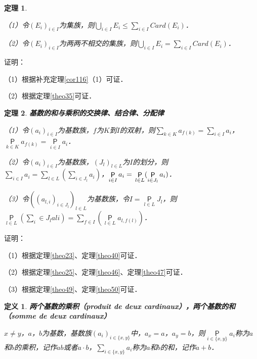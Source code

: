 \documentclass[12pt, a4paper, oneside]{book}
\newtheorem{theo}{定理}
\newtheorem{de}{定义}
\begin{document}
			\begin{theo}\label{theo94}
				\hfill\par
				（1）令$(E_i)_{i\in I}$为集族，则$\bigcup\limits_{i\in I}E_i\leq \sum\limits_{i\in I}Card(E_i)$．
				\par
				（2）令$(E_i)_{i\in I}$为两两不相交的集族，则$\bigcup\limits_{i\in I}E_i=\sum\limits_{i\in I}Card(E_i)$．
			\end{theo}
			证明：
			\par
			（1）根据补充定理\ref{cor116}（1）可证．
			\par
			（2）根据定理\ref{theo35}可证．

			\begin{theo}\label{theo95}
				\textbf{基数的和与乘积的交换律、结合律、分配律}
				\par
				（1）令$(a_i)_{i\in I}$为基数族，$f$为$K$到$I$的双射，则$\sum\limits_{k\in K}a_{f(k)}=\sum\limits_{i\in I}a_i$，$\mathop{\mathsf{P}}\limits_{k\in K}a_{f(k)}=\mathop{\mathsf{P}}\limits_{i\in I}a_i$．
				\par
				（2）令$(a_i)_{i\in I}$为基数族，$(J_l)_{l\in L}$为$I$的划分，则$\sum\limits_{i\in I}a_i=\sum\limits_{l\in L}(\sum\limits_{i\in J_l}a_i)$，$\mathop{\mathsf{P}}\limits_{i\in I}a_i=\\\mathop{\mathsf{P}}\limits_{l\in L}(\mathop{\mathsf{P}}\limits_{i\in J_l}a_i)$．
				\par
				（3）令$((a_{l,i})_{i\in J_l})_{l\in L}$为基数族，令$I=\mathop{\mathsf{P}}\limits_{l\in L}J_l$，则$\mathop{\mathsf{P}}\limits_{l\in L}(\sum\limits_i\in J_lali)=\sum\limits_{f\in I}(\mathop{\mathsf{P}}\limits_{l\in L}a_{l,f(l)})$．
			\end{theo}
			证明：
			\par
			（1）根据定理\ref{theo23}、定理\ref{theo40}可证．
			\par
			（2）根据定理\ref{theo25}、定理\ref{theo46}、定理\ref{theo47}可证．
			\par
			（3）根据定理\ref{theo49}、定理\ref{theo50}可证．
			
			\begin{de}
				\textbf{两个基数的乘积（produit de deux cardinaux），两个基数的和（somme de deux cardinaux）}
				\par
				$x\neq y$，$a$，$b$为基数，基数族$(a_i)_{i\in \{x, y\}}$中，$a_x=a$，$a_y=b$，则$\mathop{\mathsf{P}}\limits_{i\in \{x, y\}}a_i$称为$a$和$b$的乘积，记作$ab$或者$a\cdot b$，$\sum\limits_{i\in \{x, y\}}a_i$称为$a$和$b$的和，记作$a+b$．
			\end{de}
			
\end{document}
